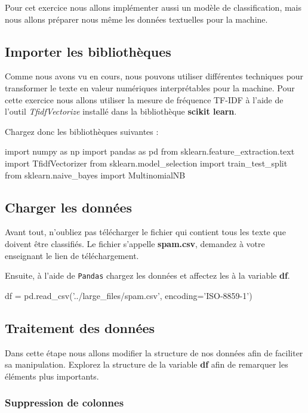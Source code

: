 Pour cet exercice nous allons implémenter aussi un modèle de classification, mais nous allons préparer nous même les données textuelles pour la machine.

\subsection{Importer les bibliothèques}

Comme nous avons vu en cours, nous pouvons utiliser différentes techniques pour transformer le texte en valeur numériques interprétables pour la machine. Pour cette exercice nous allons utiliser la mesure de fréquence TF-IDF à l'aide de l'outil \textit{TfidfVectorize} installé dans la bibliothèque  \textbf{scikit learn}.

Chargez donc les bibliothèques suivantes :
\begin{python}
import numpy as np
import pandas as pd
from sklearn.feature_extraction.text import TfidfVectorizer
from sklearn.model_selection import train_test_split
from sklearn.naive_bayes import MultinomialNB
\end{python}

\subsection{Charger les données}
Avant tout, n'oubliez pas télécharger le fichier qui contient tous les texte que doivent être classifiés. Le fichier s'appelle \textbf{spam.csv}, demandez à votre enseignant le lien de téléchargement.

Ensuite, à l'aide de \texttt{Pandas} chargez les données et affectez les à la variable \textbf{df}.
\begin{python}
df = pd.read_csv('../large_files/spam.csv', encoding='ISO-8859-1')
\end{python}

\subsection{Traitement des données}
Dans cette étape nous allons modifier la structure de nos données afin de faciliter sa manipulation. Explorez la structure de la variable \textbf{df} afin de remarquer les éléments plus importants.

\subsubsection{Suppression de colonnes}

